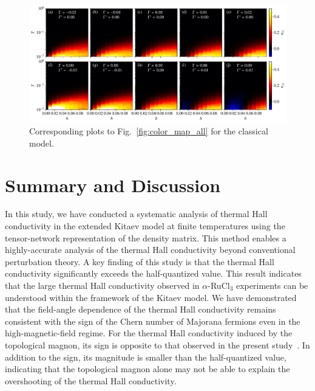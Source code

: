 \documentclass[twocolumn,superscriptaddress,showpacs, longbibliography, aps, prb]{revtex4-2}
\newcommand{\red}[1]{\textcolor{red}{#1}}
\newcommand{\blue}[1]{\textcolor{blue}{#1}}
\begin{document}
\begin{figure}
  \begin{center}
    \includegraphics[width=\linewidth]{Figs/fig_cmap_classical.pdf}
  \end{center}
  \caption{
   Corresponding plots to Fig.~\ref{fig:color_map_all} for the classical model.
   }
  \label{fig:cmap_classical}
\end{figure}

\clearpage
\section{Summary and Discussion}
\label{sec:Summary}
In this study, we %
have conducted a systematic analysis of thermal Hall conductivity 
in the extended Kitaev model at finite temperatures using the tensor-network 
representation of the density matrix. 
This method enables %
a highly-accurate analysis of the
thermal Hall conductivity beyond %
conventional perturbation theory. 
A key finding of this study is that the thermal Hall conductivity %
significantly exceeds the half-quantized value. 
This result indicates that the large thermal Hall conductivity observed in $\alpha$-RuCl$_3$ experiments 
can be %
understood within the framework of the Kitaev model. 
We have demonstrated that the field-angle dependence of the thermal Hall conductivity remains consistent with the sign of the Chern number 
of Majorana fermions even in the high-magnetic-field regime.
For the thermal Hall conductivity induced by the topological magnon, %
its sign is opposite to %
that observed in the present study~\cite{McClarty_PRB2018}. 
In %
addition to the sign, its magnitude is smaller than the half-quantized value, indicating that the %
topological magnon alone may %
not be able to explain the overshooting of the thermal Hall conductivity.
\end{document}
